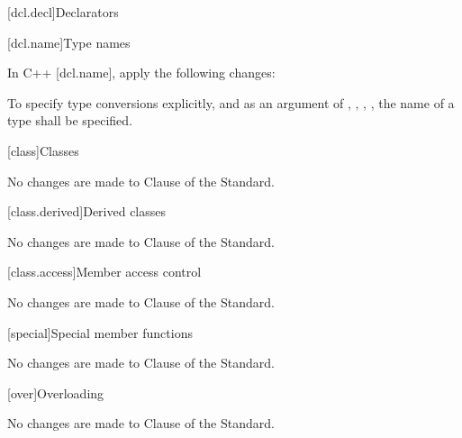 
[dcl.decl]{Declarators}

[dcl.name]{Type names}

\pnum
In C++ [dcl.name], apply the following changes:

\begin{std.txt}
To specify type conversions explicitly, and as an argument of ,
, ,  ,  the name of a type shall be specified.
\end{std.txt}

[class]{Classes}

No changes are made to Clause \the\value{chapter} of the \Cpp Standard.

[class.derived]{Derived classes}

No changes are made to Clause \the\value{chapter} of the \Cpp Standard.

[class.access]{Member access control}

No changes are made to Clause \the\value{chapter} of the \Cpp Standard.

[special]{Special member functions}

No changes are made to Clause \the\value{chapter} of the \Cpp Standard.

[over]{Overloading}

No changes are made to Clause \the\value{chapter} of the \Cpp Standard.

